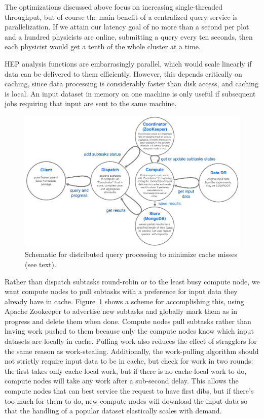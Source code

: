 \documentclass[a4paper]{jpconf}
\begin{document}
The optimizations discussed above focus on increasing single-threaded throughput, but of course the main benefit of a centralized query service is parallelization. If we attain our latency goal of no more than a second per plot and a hundred physicists are online, submitting a query every ten seconds, then each physicist would get a tenth of the whole cluster at a time.

HEP analysis functions are embarrasingly parallel, which would scale linearly if data can be delivered to them efficiently. However, this depends critically on caching, since data processing is considerably faster than disk access, and caching is local. An input dataset in memory on one machine is only useful if subsequent jobs requiring that input are sent to the same machine.

\begin{figure}
\begin{center}
\includegraphics[width=0.7\linewidth]{distributed-layout.png}
\end{center}

\caption{\label{fig:distributed} Schematic for distributed query processing to minimize cache misses (see text).}
\end{figure}

Rather than dispatch subtasks round-robin or to the least busy compute node, we want compute nodes to pull subtasks with a preference for input data they already have in cache. Figure~\ref{fig:distributed} shows a scheme for accomplishing this, using Apache Zookeeper to advertise new subtasks and globally mark them as in progress and delete them when done. Compute nodes pull subtasks rather than having work pushed to them because only the compute nodes know which input datasets are locally in cache. Pulling work also reduces the effect of stragglers for the same reason as work-stealing. Additionally, the work-pulling algorithm should not strictly require input data to be in cache, but check for work in two rounds: the first takes only cache-local work, but if there is no cache-local work to do, compute nodes will take any work after a sub-second delay. This allows the compute nodes that can best service the request to have first dibs, but if there's too much for them to do, new compute nodes will download the input data so that the handling of a popular dataset elastically scales with demand.
\end{document}
